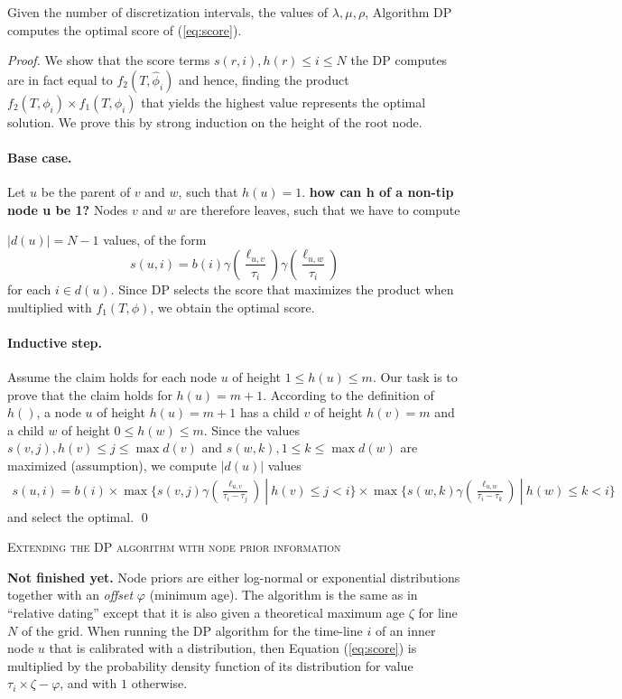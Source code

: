 \documentclass{llncs}
\renewcommand{\section}[1]{%
\bigskip
\begin{center}
\begin{Large}
\normalfont\scshape #1
\medskip
\end{Large}
\end{center}}
\begin{document}
\begin{theorem}[Optimality of DP]
Given the number of discretization intervals, the values of $\lambda,\mu,\rho$,
Algorithm DP computes the optimal score of (\ref{eq:score}).
\end{theorem}
\begin{proof}
We show that the score terms $s(r,i), h(r) \leq i \leq N$ the DP computes are
in fact equal to $f_2(T,\hat\phi_i)$ and hence, finding the product
$f_2(T,\phi_i)\times f_1(T,\phi_i)$ that yields the highest value represents the
optimal solution. We prove this by strong induction on the height of the
root node.
\paragraph{Base case.} Let $u$ be the parent of $v$ and $w$, such that $h(u) =

1$. {\bf how can h of a non-tip node u be 1?} 
Nodes $v$ and $w$ 
are therefore leaves, such that we have to compute

$|d(u)|=N-1$ values, of the form
%
%
$$
s(u,i) = b(i)
         \gamma(\frac{\ell_{u,v}}{\tau_i})
         \gamma(\frac{\ell_{u,w}}{\tau_i})
$$
%
%
for each $i \in d(u)$. Since DP selects the score that maximizes the product
when multiplied with $f_1(T,\phi)$, we obtain the optimal score.
\paragraph{Inductive step.} Assume the claim holds for each node $u$ of height
$1 \leq h(u) \leq m$. Our task is to prove that the claim holds for $h(u) =
m+1$.  According to the definition of $h()$, a node $u$ of height $h(u)=m+1$
has a child $v$ of height $h(v)=m$ and a child $w$ of height $0 \leq h(w) \leq
m$.  Since the values $s(v,j), h(v) \leq j \leq \max d(v)$ and $s(w,k), 1 \leq
k \leq \max d(w)$ are maximized (assumption), we compute $|d(u)|$ values
%
%
\begin{equation*}
\begin{split}
s(u,i) =  b(i)\times 
          \max\{ s(v,j)\gamma(\frac{\ell_{u,v}}{\tau_i-\tau_j})\ |\
              h(v) \leq j < i\} \times 
          \max\{ s(w,k)\gamma(\frac{\ell_{u,w}}{\tau_i-\tau_k})\ |\ 
               h(w) \leq k < i\}
\end{split}
\end{equation*}
%
%
and select the optimal.
\qed\end{proof}

\section{Extending the DP algorithm with node prior information}
\textbf{Not finished yet.} Node priors are either log-normal or exponential
distributions together with an {\em offset} $\varphi$ (minimum age).  The
algorithm is the same as in ``relative dating'' except that it is also given a
theoretical maximum age $\zeta$ for line $N$ of the grid.  When running the DP
algorithm for the time-line $i$ of an inner node $u$ that is calibrated with a
distribution, then Equation (\ref{eq:score}) is multiplied by the probability
density function of its distribution for value $\tau_i \times \zeta - \varphi$,
and with $1$ otherwise.
\end{document}
